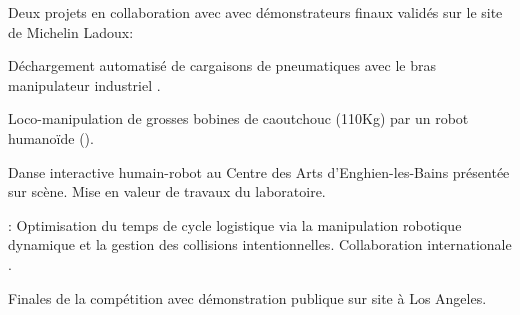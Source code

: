 \begin{cventries}
{\begin{cvitems}
      \begin{subitems}
      \item Deux projets en collaboration avec  avec démonstrateurs finaux validés sur le
        site de Michelin Ladoux:
        \begin{subitems}
        \item Déchargement automatisé de cargaisons de pneumatiques avec le bras manipulateur industriel
          .
        \item Loco-manipulation de grosses bobines de caoutchouc (110Kg) par un robot humanoïde ().
        \end{subitems}
      \item Danse interactive humain-robot au Centre des Arts d'Enghien-les-Bains présentée sur scène. Mise en
        valeur de travaux du laboratoire.
      \item {}: Optimisation du temps de cycle logistique via la
        manipulation robotique dynamique et la gestion des collisions intentionnelles. Collaboration
        internationale .
      \item Finales de la compétition  avec démonstration publique sur site à Los Angeles.
      \end{subitems}
    \end{cvitems}
  }


\end{cventries}
